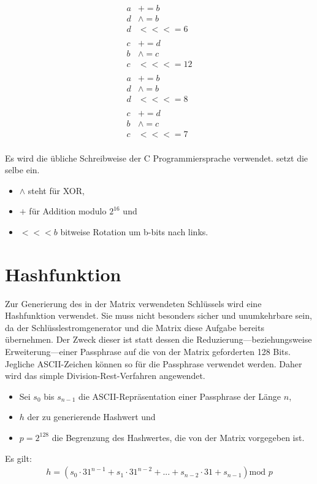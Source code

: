 \documentclass[10pt,a4paper]{article}
\begin{document}
\begin{align*}
    a & +=       b  \\
    d & \wedge = b  \\
    d & <<<=     6  \\
      &             \\
    c & +=       d  \\
    b & \wedge = c  \\
    c & <<<=     12 \\
      &             \\
    a & +=       b  \\
    d & \wedge = b  \\
    d & <<<=     8  \\
      &             \\
    c & +=       d  \\
    b & \wedge = c  \\
    c & <<<=     7  \\
\end{align*}

Es wird die übliche Schreibweise der C Programmiersprache verwendet.
\cite{Bernstein2008} setzt die selbe ein.
\begin{itemize}
    \item $\wedge$ steht für XOR,
    \item $+$ für Addition modulo $2^{16}$ und
    \item $<<<b$ bitweise Rotation um b-bits nach links.
\end{itemize}

\section{Hashfunktion}

Zur Generierung des in der Matrix verwendeten Schlüssels wird eine Hashfunktion verwendet.
Sie muss nicht besonders sicher und unumkehrbare sein, da der Schlüsslestromgenerator und die Matrix diese Aufgabe bereits übernehmen.
Der Zweck dieser ist statt dessen die Reduzierung---beziehungsweise Erweiterung---einer Passphrase auf die von der Matrix geforderten 128 Bits.
Jegliche ASCII-Zeichen können so für die Passphrase verwendet werden.
Daher wird das simple Division-Rest-Verfahren\cite{Silies2021} angewendet.

\begin{itemize}
    \item Sei $s_0$ bis $s_{n-1}$ die ASCII-Repräsentation einer Passphrase der Länge $n$,
    \item $h$ der zu generierende Hashwert und
    \item $p = 2^{128}$ die Begrenzung des Hashwertes, die von der Matrix vorgegeben ist.
\end{itemize}
Es gilt:
\begin{align*}
    h = \left( s_0 \cdot 31^{n-1} + s_1 \cdot 31^{n-2} + ... + s_{n-2} \cdot 31 + s_{n-1}\right)\text{mod } p
\end{align*}
\end{document}
